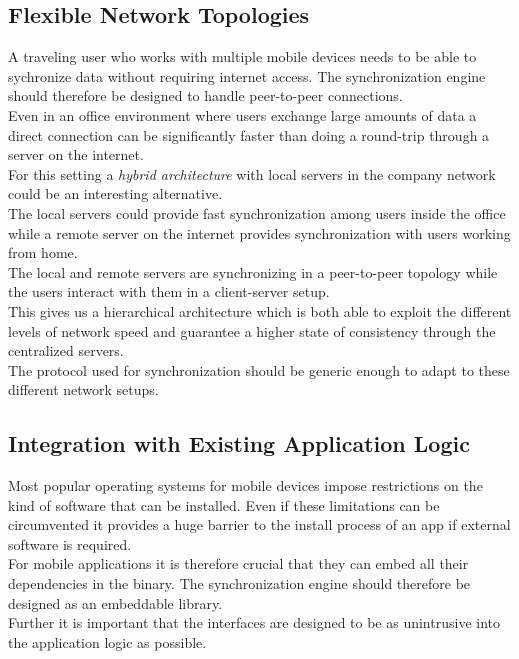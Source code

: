 \subsection{Flexible Network Topologies}
A traveling user who works with multiple mobile devices needs to be able to sychronize data without requiring internet access.
The synchronization engine should therefore be designed to handle peer-to-peer connections.\\
Even in an office environment where users exchange large amounts of data a direct connection can be significantly faster than doing a round-trip through a server on the internet.\\
For this setting a \emph{hybrid architecture} with local servers in the company network could be an interesting alternative.\\
The local servers could provide fast synchronization among users inside the office while a remote server on the internet provides synchronization with users working from home.\\
The local and remote servers are synchronizing in a peer-to-peer topology while the users interact with them in a client-server setup.\\
This gives us a hierarchical architecture which is both able to exploit the different levels of network speed and guarantee a higher state of consistency through the centralized servers.\\

The protocol used for synchronization should be generic enough to adapt to these different network setups.

\subsection{Integration with Existing Application Logic}
Most popular operating systems for mobile devices impose restrictions on the kind of software that can be installed.
Even if these limitations can be circumvented it provides a huge barrier to the install process of an app if external software is required.\\
For mobile applications it is therefore crucial that they can embed all their dependencies in the binary.
The synchronization engine should therefore be designed as an embeddable library.\\
Further it is important that the interfaces are designed to be as unintrusive into the application logic as possible.\\

